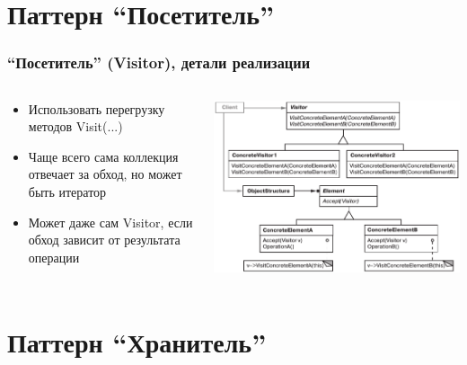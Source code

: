 \documentclass[xetex,mathserif,serif]{beamer}
\begin{document}
	\section{Паттерн ``Посетитель''}

	\begin{frame}
		\frametitle{``Посетитель'' (Visitor), детали реализации}
		\begin{columns}
			\begin{column}{0.4\textwidth}
				\begin{itemize}
					\item Использовать перегрузку методов Visit(...)
					\item Чаще всего сама коллекция отвечает за обход, но может быть итератор
					\item Может даже сам Visitor, если обход зависит от результата операции
				\end{itemize}
			\end{column}
			\begin{column}{0.6\textwidth}
				\begin{center}
					\includegraphics[width=\textwidth]{visitor.png}
				\end{center}
			\end{column}
		\end{columns}
	\end{frame}

	\section{Паттерн ``Хранитель''}
\end{document}
